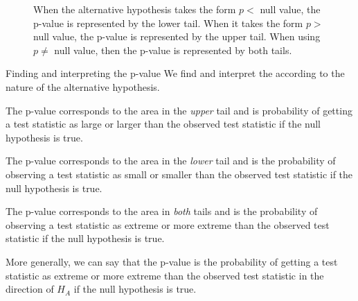 \D{\newpage}

\begin{figure}[ht]
\centering
{}
\caption{When the alternative hypothesis takes the form $p <$ null value, the p-value is represented by the lower tail. When it takes the form $p >$ null value, the p-value is represented by the upper tail. When using $p \neq$ null value, then the p-value is represented by both tails.}
\label{sidedness_example_figures}
\end{figure}

\begin{onebox}{Finding and interpreting the p-value}
We find and interpret the  according to the nature of the alternative hypothesis.\vspace{-1mm}
\begin{description}
\setlength{\itemsep}{0mm}

\item[$H_A$: parameter $>$ null value.] The p-value corresponds to the area in the \emph{upper} tail and is probability of getting a test statistic as large or larger than the observed test statistic if the null hypothesis is true.  

\item[$H_A$: parameter $<$ null value.] The p-value corresponds to the area in the \emph{lower} tail and is the probability of observing a test statistic as small or smaller than the observed test statistic if the null hypothesis is true. 

\item[$H_A$: parameter $\ne$ null value.] The p-value corresponds to the area in \emph{both} tails and is the probability of observing a test statistic as extreme or more extreme than the observed test statistic if the null hypothesis is true. 
\end{description}
\noindent More generally, we can say that the p-value is the probability of getting a test statistic as extreme or more extreme than the observed test statistic in the direction of $H_A$ if the null hypothesis is true.
\end{onebox}




